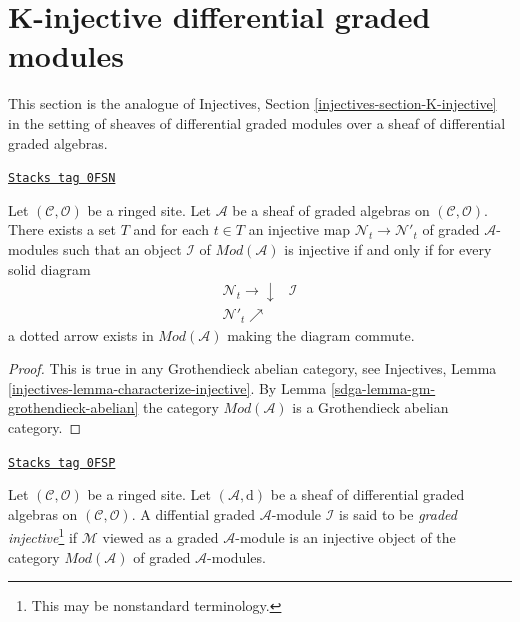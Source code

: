 \section{K-injective differential graded modules}
\label{sdga-section-K-injective}
This section is the analogue of
Injectives, Section \ref{injectives-section-K-injective}
in the setting of sheaves of differential graded modules
over a sheaf of differential graded algebras.

\begin{lemma}
\label{sdga-lemma-characterize-injectives}
\href{https://stacks.math.columbia.edu/tag/0FSN}{\texttt{Stacks tag 0FSN}}

Let $(\mathcal{C}, \mathcal{O})$ be a ringed site. Let $\mathcal{A}$
be a sheaf of graded algebras on $(\mathcal{C}, \mathcal{O})$.
There exists a set $T$ and for each $t \in T$ an injective map
$\mathcal{N}_t \to \mathcal{N}'_t$ of graded $\mathcal{A}$-modules
such that an object $\mathcal{I}$ of $\textit{Mod}(\mathcal{A})$
is injective if and only if for every solid diagram
$$
\begin{array}{cc}\mathcal{N}_t \longrightarrow\downarrow & \mathcal{I} \\ \mathcal{N}'_t \nearrow & \end{array}
$$
a dotted arrow exists in $\textit{Mod}(\mathcal{A})$ making the diagram commute.
\end{lemma}

\begin{proof}

This is true in any Grothendieck abelian category, see
Injectives, Lemma \ref{injectives-lemma-characterize-injective}.
By Lemma \ref{sdga-lemma-gm-grothendieck-abelian} the category
$\textit{Mod}(\mathcal{A})$ is a Grothendieck abelian category.
\end{proof}

\begin{definition}
\label{sdga-definition-graded-injective}
\href{https://stacks.math.columbia.edu/tag/0FSP}{\texttt{Stacks tag 0FSP}}

Let $(\mathcal{C}, \mathcal{O})$ be a ringed site.
Let $(\mathcal{A}, \text{d})$ be a sheaf of differential graded algebras
on $(\mathcal{C}, \mathcal{O})$. A diffential graded $\mathcal{A}$-module
$\mathcal{I}$ is said to be {\it graded injective}\footnote{This may be
nonstandard terminology.} if $\mathcal{M}$ viewed as a graded
$\mathcal{A}$-module is an injective object of the category
$\textit{Mod}(\mathcal{A})$ of graded $\mathcal{A}$-modules.
\end{definition}

